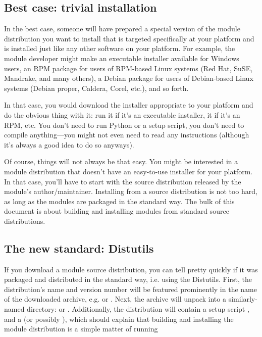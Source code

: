 \documentclass{howto}
\begin{document}
\subsection{Best case: trivial installation}
\label{trivial-install}

In the best case, someone will have prepared a special version of the
module distribution you want to install that is targeted specifically at
your platform and is installed just like any other software on your
platform.  For example, the module developer might make an executable
installer available for Windows users, an RPM package for users of
RPM-based Linux systems (Red Hat, SuSE, Mandrake, and many others), a
Debian package for users of Debian-based Linux systems (Debian proper,
Caldera, Corel, etc.), and so forth.

In that case, you would download the installer appropriate to your
platform and do the obvious thing with it: run it if it's an executable
installer,  it if it's an RPM, etc.  You don't need
to run Python or a setup script, you don't need to compile
anything---you might not even need to read any instructions (although
it's always a good idea to do so anyways).

Of course, things will not always be that easy.  You might be interested
in a module distribution that doesn't have an easy-to-use installer for
your platform.  In that case, you'll have to start with the source
distribution released by the module's author/maintainer.  Installing
from a source distribution is not too hard, as long as the modules are
packaged in the standard way.  The bulk of this document is about
building and installing modules from standard source distributions.


\subsection{The new standard: Distutils}
\label{new-standard}

If you download a module source distribution, you can tell pretty
quickly if it was packaged and distributed in the standard way, i.e.
using the Distutils.  First, the distribution's name and version number
will be featured prominently in the name of the downloaded archive, e.g.
 or .  Next, the archive
will unpack into a similarly-named directory:  or
.  Additionally, the distribution will contain a
setup script , and a  (or possibly
), which should explain that building and installing the
module distribution is a simple matter of running
\end{document}
